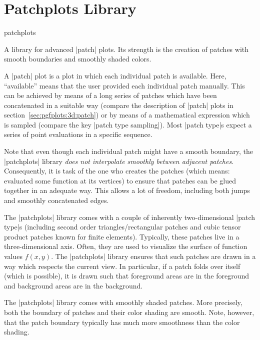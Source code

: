 
\section{Patchplots Library}
\label{sec:lib:patchplots}

{
\def\pgfplotsmanualcurlibrary{patchplots}

\begin{pgfplotslibrary}{patchplots}

A library for advanced |patch| plots. Its strength is the creation of patches
with smooth boundaries and smoothly shaded colors.

A |patch| plot is a plot in which each individual patch is available. Here,
``available'' means that the user provided each individual patch manually. This
can be achieved by means of a long series of patches which have been
concatenated in a suitable way (compare the description of |patch| plots in
section~\ref{sec:pgfplots:3d:patch}) or by means of a mathematical expression
which is sampled (compare the key |patch type sampling|). Most |patch type|s
expect a series of point evaluations in a specific sequence.

Note that even though each individual patch might have a smooth boundary, the
|patchplots| library \emph{does not interpolate smoothly between adjacent
patches}. Consequently, it is task of the one who creates the patches (which
means: evaluated some function at its vertices) to ensure that patches can be
glued together in an adequate way. This allows a lot of freedom, including both
jumps and smoothly concatenated edges.

The |patchplots| library comes with a couple of inherently two-dimensional
|patch type|s (including second order triangles/rectangular patches and cubic
tensor product patches known for finite elements). Typically, these patches
live in a three-dimensional axis. Often, they are used to visualize the surface
of function values $f(x,y)$. The |patchplots| library ensures that such patches
are drawn in a way which respects the current view. In particular, if a patch
folds over itself (which is possible), it is drawn such that foreground areas
are in the foreground and background areas are in the background.

The |patchplots| library comes with smoothly shaded patches. More precisely,
both the boundary of patches and their color shading are smooth. Note, however,
that the patch boundary typically has much more smoothness than the color
shading.


\end{pgfplotslibrary}}
